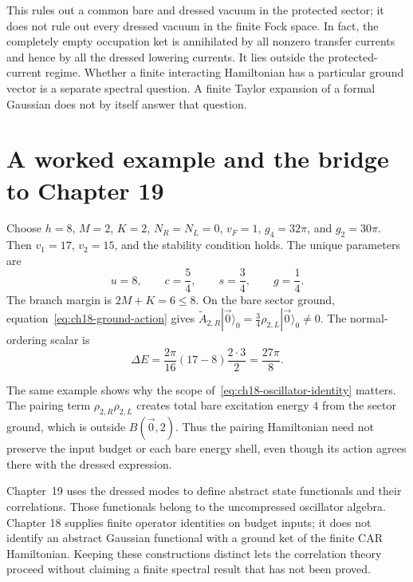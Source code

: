 This rules out a common bare and dressed vacuum in the protected sector; it does not rule out every dressed vacuum in the finite Fock space. In fact, the completely empty occupation ket is annihilated by all nonzero transfer currents and hence by all the dressed lowering currents. It lies outside the protected-current regime. Whether a finite interacting Hamiltonian has a particular ground vector is a separate spectral question. A finite Taylor expansion of a formal Gaussian does not by itself answer that question.

\section{A worked example and the bridge to Chapter 19}

Choose $h=8$, $M=2$, $K=2$, $N_R=N_L=0$, $v_F=1$, $g_4=32\pi$, and $g_2=30\pi$. Then $v_1=17$, $v_2=15$, and the stability condition holds. The unique parameters are
\begin{equation}
  u=8,\qquad c=\frac54,\qquad s=\frac34,\qquad g=\frac14.
\end{equation}
The branch margin is $2M+K=6\leq8$. On the bare sector ground, equation~\eqref{eq:ch18-ground-action} gives $\widetilde A_{2,R}|\vec0\rangle_0=\frac34\rho_{2,L}|\vec0\rangle_0\ne0$. The normal-ordering scalar is
\begin{equation}
  \Delta E=\frac{2\pi}{16}(17-8)\frac{2\cdot3}{2}
  =\frac{27\pi}{8}.
\end{equation}

The same example shows why the scope of~\eqref{eq:ch18-oscillator-identity} matters. The pairing term $\rho_{2,R}\rho_{2,L}$ creates total bare excitation energy $4$ from the sector ground, which is outside $B(\vec0,2)$. Thus the pairing Hamiltonian need not preserve the input budget or each bare energy shell, even though its action agrees there with the dressed expression.

Chapter~19 uses the dressed modes to define abstract state functionals and their correlations. Those functionals belong to the uncompressed oscillator algebra. Chapter 18 supplies finite operator identities on budget inputs; it does not identify an abstract Gaussian functional with a ground ket of the finite CAR Hamiltonian. Keeping these constructions distinct lets the correlation theory proceed without claiming a finite spectral result that has not been proved.
